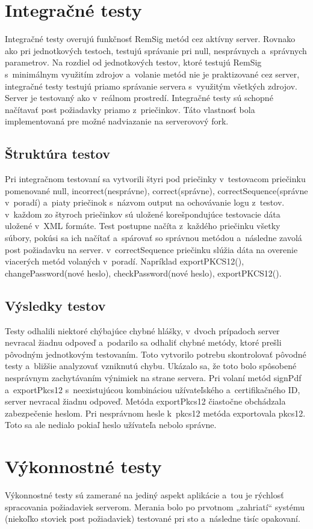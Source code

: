 \documentclass[
  printed, %
  notable,   %
  nolof,     %
    oneside,       %
  nolot,     %
]{fithesis3}
\begin{document}
\section{Integračné testy}
Integračné testy  overujú funkčnosť RemSig metód cez aktívny server. Rovnako ako pri jednotkových testoch, testujú správanie pri null, nesprávnych a~správnych parametrov. Na rozdiel od jednotkových testov, ktoré testujú RemSig s~minimálnym využitím zdrojov a~volanie metód nie je praktizované cez server, integračné testy testujú priamo správanie servera s~využitým všetkých zdrojov. Server je testovaný ako v~reálnom prostredí. Integračné testy sú schopné načítavať post požiadavky priamo z~priečinkov. Táto  vlastnosť bola implementovaná pre možné nadviazanie na  serverovový  fork.
\subsection{Štruktúra testov}
Pri integračnom testovaní sa  vytvorili štyri pod priečinky  v~testovacom priečinku pomenované null, incorrect(nesprávne), correct(správne), correctSequence(správne v~poradí) a~piaty priečinok s~názvom output na ochovávanie logu z~testov. v~každom zo štyroch priečinkov sú uložené korešpondujúce testovacie dáta uložené v~XML formáte. Test postupne načíta z~každého priečinku všetky súbory, pokúsi sa ich načítať a~spárovať so správnou metódou a~následne zavolá post požiadavku na server.  v~correctSequence priečinku slúžia dáta na overenie viacerých metód volaných v~poradí. Napríklad exportPKCS12(), changePassword(nové heslo), checkPassword(nové heslo), exportPKCS12().
\subsection{Výsledky testov}
Testy odhalili niektoré chýbajúce chybné hlášky, v~dvoch prípadoch server nevracal žiadnu odpoveď a~podarilo sa odhaliť chybné metódy, ktoré prešli pôvodným jednotkovým testovaním. Toto vytvorilo potrebu skontrolovať pôvodné testy a~bližšie analyzovať vzniknutú chybu. Ukázalo sa, že toto bolo spôsobené nesprávnym zachytávaním výnimiek na strane servera. Pri volaní metód signPdf a~exportPkcs12 s~neexistujúcou kombináciou užívateľského a~certifikačného ID, server nevracal žiadnu odpoveď. Metóda exportPkcs12 čiastočne obchádzala zabezpečenie heslom. Pri nesprávnom hesle k~pkcs12 metóda exportovala pkcs12. Toto sa ale nedialo pokiaľ heslo užívateľa nebolo správne.
\section{Výkonnostné testy}
Výkonnostné testy sú zamerané na jediný aspekt aplikácie a~tou je rýchlosť spracovania požiadaviek serverom. Merania bolo po prvotnom „zahriatí“ systému (niekoľko stoviek post požiadaviek) testované pri sto a~následne tisíc opakovaní.
\end{document}
